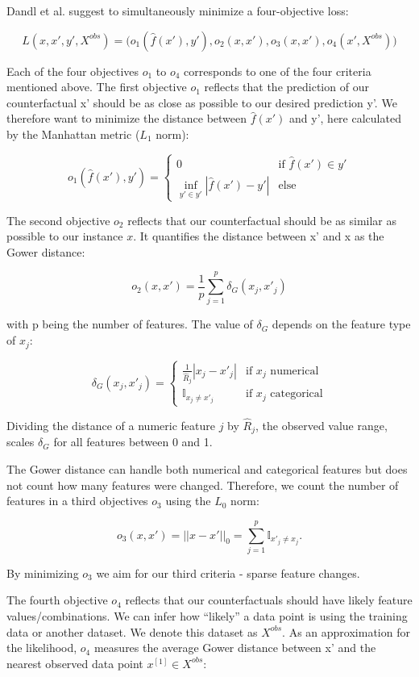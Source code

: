 \documentclass[12pt,]{krantz}
\begin{document}
Dandl et al. suggest to simultaneously minimize a four-objective loss:

\[L(x,x',y',X^{obs})=\big(o_1(\hat{f}(x'),y'),o_2(x, x'),o_3(x,x'),o_4(x',X^{obs})\big) \]

Each of the four objectives \(o_1\) to \(o_4\) corresponds to one of the
four criteria mentioned above. The first objective \(o_1\) reflects that
the prediction of our counterfactual x' should be as close as possible
to our desired prediction y'. We therefore want to minimize the distance
between \(\hat{f}(x')\) and y', here calculated by the Manhattan metric
(\(L_1\) norm):

\[o_1(\hat{f}(x'),y')=\begin{cases}0&\text{if $\hat{f}(x')\in{}y'$}\\\inf\limits_{y'\in y'}|\hat{f}(x')-y'|&\text{else}\end{cases}\]

The second objective \(o_2\) reflects that our counterfactual should be
as similar as possible to our instance \(x\). It quantifies the distance
between x' and x as the Gower distance:

\[o_2(x,x')=\frac{1}{p}\sum_{j=1}^{p}\delta_G(x_j, x'_j)\]

with p being the number of features. The value of \(\delta_G\) depends
on the feature type of \(x_j\):

\[\delta_G(x_j,x'_j)=\begin{cases}\frac{1}{\widehat{R}_j}|x_j-x'_j|&\text{if $x_j$ numerical}\\\mathbb{I}_{x_j\neq{}x'_j}&\text{if $x_j$ categorical}\end{cases}\]

Dividing the distance of a numeric feature \(j\) by \(\widehat{R}_j\),
the observed value range, scales \(\delta_G\) for all features between 0
and 1.

The Gower distance can handle both numerical and categorical features
but does not count how many features were changed. Therefore, we count
the number of features in a third objectives \(o_3\) using the \(L_0\)
norm:

\[o_3(x,x')=||x-x'||_0=\sum_{j=1}^{p}\mathbb{I}_{x'_j\neq x_j}.\]

By minimizing \(o_3\) we aim for our third criteria - sparse feature
changes.

The fourth objective \(o_4\) reflects that our counterfactuals should
have likely feature values/combinations. We can infer how ``likely'' a
data point is using the training data or another dataset. We denote this
dataset as \(X^{obs}\). As an approximation for the likelihood, \(o_4\)
measures the average Gower distance between x' and the nearest observed
data point \(x^{[1]}\in{}X^{obs}\):
\end{document}
